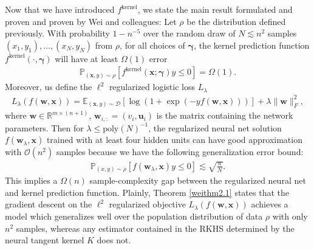 \documentclass{article}
\newenvironment{manualtheorem}[1]{%
  \renewcommand\themanualtheoreminner{#1}%
  \manualtheoreminner
}{\endmanualtheoreminner}
\begin{document}
Now that we have introduced $f^{\text{kernel}}$, we state the main result formulated and proven and proven by Wei and colleagues: 
\begin{manualtheorem}{2.1}[from \cite{wei2019regularization}]\label{weithm2.1}
Let $\rho$ be the distribution defined previously. With probability $1 - n^{-5}$ over the random draw of $N \lesssim n^2$ samples $(x_1, y_1), \ldots, (x_N, y_N)$ from $\rho$, for all choices of $\boldsymbol{\gamma}$, the kernel prediction function $f^{\text{kernel}}(\cdot, \boldsymbol{\gamma})$ will have at least $\Omega(1)$ error
\begin{align*}
    \mathbb{P}_{(\boldsymbol{x}, y) \sim \rho}[f^{\text{kernel}}(\boldsymbol{x}; \boldsymbol{\gamma})y \leq 0] = \Omega(1).
\end{align*}
Moreover, us define the $\ell^2$ regularized logistic loss $L_{\lambda}$
\begin{align*}
    L_{\lambda}(f(\boldsymbol{w}, \boldsymbol{x})) = \mathbb{E}_{(\boldsymbol{x}, y) \sim \mathcal{D}} \left[\log \left( 1 + \exp(-y f(\boldsymbol{w}, \boldsymbol{x})) \right) \right] + \lambda \|\boldsymbol{w} \|_F^2,
\end{align*}
where $\boldsymbol{w} \in \mathbb{R}^{m \times (n+1)}$, $\boldsymbol{w}_{i,:} = (v_i, \boldsymbol{u}_i)$ is the matrix containing the network parameters. Then for $\lambda \leq \text{poly}(N)^{-1}$, the regularized neural net solution $f(\boldsymbol{w}_{\lambda}, \boldsymbol{x})$ trained with at least four hidden units can have good approximation with $\mathcal{O}(n^2)$ samples because we have the following generalization error bound:
\begin{align*}
   \mathbb{P}_{(x,y) \sim \rho}[f(\boldsymbol{w}_{\lambda}, \boldsymbol{x})y \leq 0] \lesssim \sqrt{\frac{n}{N}}.
\end{align*}
This implies a $\Omega(n)$ sample-complexity gap between the regularized neural net and kernel prediction function.
\end{manualtheorem}
Plainly, Theorem \ref{weithm2.1} states that the gradient descent on the $\ell^2$ regularized objective $L_{\lambda}(f(\boldsymbol{w}, \boldsymbol{x}))$ achieves a model which generalizes well over the population distribution of data $\rho$ with only $n^2$ samples, whereas any estimator contained in the RKHS determined by the neural tangent kernel $K$ does not.
\end{document}
